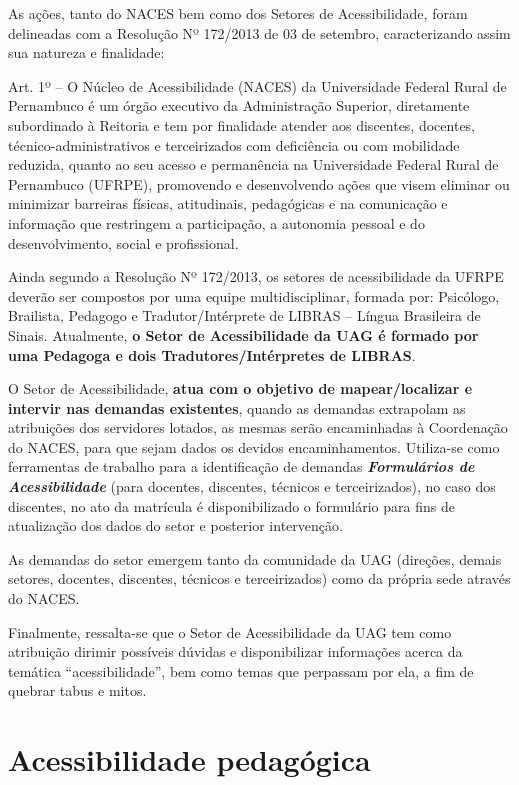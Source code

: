 \documentclass[
	12pt,				%
	openright,			%
  oneside,     %
	a4paper,			%
 hyphens,
	chapter=TITLE,		%
	english,			%
	french,				%
	spanish,			%
	brazil				%
	]{abntex2}
\begin{document}
As ações, tanto do NACES bem como dos Setores de Acessibilidade, foram delineadas com a Resolução Nº 172/2013 de 03 de setembro, caracterizando assim sua natureza e finalidade:

\begin{citacao}
    Art. 1º – O Núcleo de Acessibilidade (NACES) da Universidade Federal Rural de Pernambuco é um órgão executivo da Administração Superior, diretamente subordinado à Reitoria e tem por finalidade atender aos discentes, docentes, técnico-administrativos e terceirizados com deficiência ou com mobilidade reduzida, quanto ao seu acesso e permanência na Universidade Federal Rural de Pernambuco (UFRPE), promovendo e desenvolvendo ações que visem eliminar ou minimizar barreiras físicas, atitudinais, pedagógicas e na comunicação e informação que restringem a participação, a autonomia pessoal e do desenvolvimento, social e profissional.
\end{citacao}

Ainda segundo a Resolução Nº 172/2013, os setores de acessibilidade da UFRPE deverão ser compostos por uma equipe multidisciplinar, formada por: Psicólogo, Brailista, Pedagogo e Tradutor/Intérprete de LIBRAS – Língua Brasileira de Sinais. Atualmente, \textbf{o Setor de Acessibilidade da UAG é formado por uma Pedagoga e dois Tradutores/Intérpretes de LIBRAS}.

O Setor de Acessibilidade, \textbf{atua com o objetivo de mapear/localizar e intervir nas demandas existentes}, quando as demandas extrapolam as atribuições dos servidores lotados, as mesmas serão encaminhadas à Coordenação do NACES, para que sejam dados os devidos encaminhamentos. Utiliza-se como ferramentas de trabalho para a identificação de demandas {\bfseries \textit{Formulários de Acessibilidade}} (para docentes, discentes, técnicos e terceirizados), no caso dos discentes, no ato da matrícula é disponibilizado o formulário para fins de atualização dos dados do setor e posterior intervenção.

As demandas do setor emergem tanto da comunidade da UAG (direções, demais setores, docentes, discentes, técnicos e terceirizados) como da própria sede através do NACES.

Finalmente, ressalta-se que o Setor de Acessibilidade da UAG tem como atribuição dirimir possíveis dúvidas e disponibilizar informações acerca da temática “acessibilidade”, bem como temas que perpassam por ela, a fim de quebrar tabus e mitos.

\section{Acessibilidade pedagógica}
\end{document}
